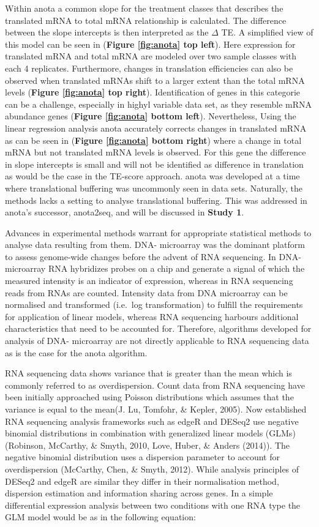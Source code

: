 \documentclass[12pt,openany]{book}
\begin{document}
Within anota a common slope for the treatment classes that describes the
translated mRNA to total mRNA relationship is calculated. The difference
between the slope intercepts is then interpreted as the \(\varDelta\)
TE. A simplified view of this model can be seen in (\textbf{Figure
\ref{fig:anota} top left}). Here expression for translated mRNA and
total mRNA are modeled over two sample classes with each 4 replicates.
Furthermore, changes in translation efficiencies can also be observed
when translated mRNAs shift to a larger extent than the total mRNA
levels (\textbf{Figure \ref{fig:anota} top right}). Identification of
genes in this categorie can be a challenge, especially in highyl
variable data set, as they resemble mRNA abundance genes (\textbf{Figure
\ref{fig:anota} bottom left}). Nevertheless, Using the linear regression
analysis anota accurately corrects changes in translated mRNA as can be
seen in (\textbf{Figure \ref{fig:anota} bottom right}) where a change in
total mRNA but not translated mRNA levels is observed. For this gene the
difference in slope intercepts is small and will not be identified as
difference in translation as would be the case in the TE-score approach.
anota was developed at a time where translational buffering was
uncommonly seen in data sets. Naturally, the methods lacks a setting to
analyse translational buffering. This was addressed in anota's
successor, anota2seq, and will be discussed in \textbf{Study 1}.

Advances in experimental methods warrant for appropriate statistical
methods to analyse data resulting from them. DNA- microarray was the
dominant platform to assess genome-wide changes before the advent of RNA
sequencing. In DNA- microarray RNA hybridizes probes on a chip and
generate a signal of which the measured intensity is an indicator of
expression, whereas in RNA sequencing reads from RNAs are counted.
Intensity data from DNA microarray can be normalised and transformed
(i.e.~log transformation) to fulfill the requirements for application of
linear models, whereas RNA sequencing harbours additional
characteristics that need to be accounted for. Therefore, algorithms
developed for analysis of DNA- microarray are not directly applicable to
RNA sequencing data as is the case for the anota algorithm.

RNA sequencing data shows variance that is greater than the mean which
is commonly referred to as overdispersion. Count data from RNA
sequencing have been initially approached using Poisson distributions
which assumes that the variance is equal to the mean(J. Lu, Tomfohr, \&
Kepler, 2005). Now established RNA sequencing analysis frameworks such
as edgeR and DESeq2 use negative binomial distributions in combination
with generalized linear models (GLMs) (Robinson, McCarthy, \& Smyth,
2010, Love, Huber, \& Anders (2014)). The negative binomial distribution
uses a dispersion parameter to account for overdispersion (McCarthy,
Chen, \& Smyth, 2012). While analysis principles of DESeq2 and edgeR are
similar they differ in their normalisation method, dispersion estimation
and information sharing across genes. In a simple differential
expression analysis between two conditions with one RNA type the GLM
model would be as in the following equation:
\end{document}
